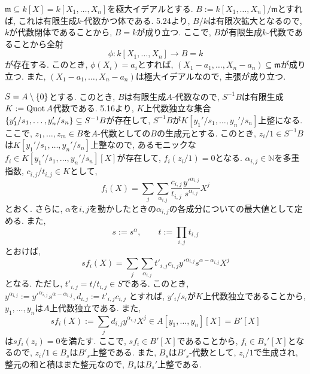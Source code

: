 \documentclass[dvipdfmx]{jsarticle}
\begin{document}
    \begin{problem}
        $\mathfrak{m} \subseteq k[X] = k[X_1, \dots, X_n]$を極大イデアルとする.
        $B := k[X_1, \dots, X_n]/\mathfrak{m}$とすれば, これは有限生成$k$-代数かつ体である.
        5.24より, $B/k$は有限次拡大となるので,
        $k$が代数閉体であることから, $B = k$が成り立つ.
        ここで, $B$が有限生成$k$-代数であることから全射
        \[
            \phi: k[X_1, \dots, X_n] \longrightarrow B = k
        \]
        が存在する.
        このとき,
        $\phi(X_i) = a_i$とすれば, $(X_1-a_1, \dots, X_n - a_n) \subseteq \mathfrak{m}$が成り立つ.
        また, $(X_1 -a_1, \dots, X_n - a_n)$は極大イデアルなので, 主張が成り立つ.
    \end{problem}

    \begin{problem}
        $S =  A \setminus \{0\}$とする.
        このとき, $B$は有限生成$A$-代数なので, $S^{-1}B$は有限生成$K:= \operatorname{Quot}{A}$代数である.
        5.16より,
        $K$上代数独立な集合$\{y_1'/s_1, \dots, y_n'/s_n\} \subseteq S^{-1}B$が存在して,
        $S^{-1}B$が$K[y_1'/s_1, \dots, y_n'/s_n]$上整になる.
        ここで, $z_1, \dots, z_m \in B$を$A$-代数としての$B$の生成元とする.
        このとき, $z_i / 1 \in S^{-1}B$は$K[y_1'/s_1, \dots, y_n'/s_n]$上整なので,
        あるモニックな$f_i \in K[y_1'/s_1, \dots, y_n'/s_n][X]$が存在して, $f_i(z_i/1) = 0$となる.
        $\alpha_{i,j} \in \mathbb{N}$を多重指数, $c_{i,j}/t_{i,j} \in K$として,
        \[
            f_i(X) = \sum_{j} \sum_{\alpha_{i,j}} \frac{c_{i,j}}{t_{i,j}} \frac{{y'}^{\alpha_{i,j}}}{s^{\alpha_{i,j}}} X^j
        \]
        とおく.
        さらに, $\alpha$を$i,j$を動かしたときの$\alpha_{i,j}$の各成分についての最大値として定める.
        また,
        \[
            s := s^\alpha, \quad \quad t := \prod_{i,j} t_{i,j}
        \]
        とおけば,
        \[
            sf_i(X) = \sum_{j} \sum_{\alpha_{i,j}}  t'_{i,j} c_{i,j} {y'}^{\alpha_{i,j}}{s^{\alpha-\alpha_{i,j}}} X^j
        \]
        となる.
        ただし, $t'_{i,j} = t/t_{i,j} \in S$である.
        このとき, $y^{\alpha_{i,j}} := y'^{\alpha_{i,j}}s^{\alpha-\alpha_{i,j}}, d_{i,j} := t'_{i,j}c_{i,j}$
        とすれば, $y'_i/s_i$が$K$上代数独立であることから, $y_1, \dots, y_n$は$A$上代数独立である.
        また,
        \[
            sf_i(X) := \sum_{j} d_{i,j}y^{\alpha_{i,j}}X^j \in A[y_1, \dots, y_n][X] = B'[X]
        \]
        は$sf_i(z_i) = 0$を満たす.
        ここで, $sf_i \in B'[X]$であることから, $f_i \in B_s'[X]$となるので,
        $z_i/1 \in B_s$は$B'_s$上整である.
        また, $B_s$は$B'_s$-代数として, $z_i/1$で生成され,
        整元の和と積はまた整元なので, $B_s$は$B_s'$上整である.
    \end{problem}
\end{document}
